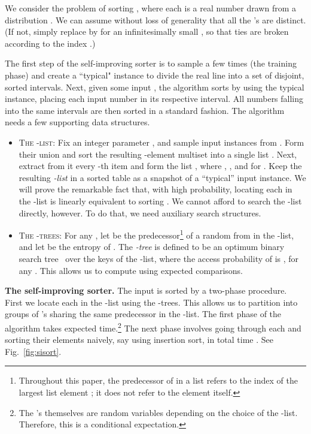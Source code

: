 \documentclass{siamltex}
\begin{document}
We consider the problem of sorting , where each  is
a real number drawn from a distribution . 
We can assume without loss of generality that all the 's
are distinct. (If not, simply replace  by  for 
an infinitesimally small , so that ties are broken according
to the index .)

The first step of the self-improving sorter is to sample  a few times
(the training phase) and create a ``typical" instance to divide the real line
into a set of disjoint, sorted intervals.  Next, given some input , the
algorithm sorts  by using the typical instance, placing each input number in
its respective interval. All numbers falling into the same intervals are then
sorted in a standard fashion. The algorithm needs a few supporting data
structures.


\begin{itemize}
\item
\textsc{The -list:}
Fix an integer parameter ,
and sample  input instances from . 
Form their union and sort the resulting -element multiset
into a single list .
Next, extract from it every -th item and form the list 
, where , ,
and  for .
Keep the resulting \emph{-list} in a sorted table as 
a snapshot of a ``typical'' input instance.
We will prove the remarkable fact that,
with high probability, locating each  in the -list
is linearly equivalent to sorting .
We cannot afford to search the -list
directly, however. To do that, we need auxiliary search structures.

\item
\textsc{The -trees:}
For any , let  
be the predecessor\footnote{Throughout this paper,
the predecessor of  in a list refers to the index of
the largest list element ; it does not
refer to the element itself.}
of a random  from  
in the -list, and let  be the entropy of 
.
The \emph{-tree} is defined to be an optimum binary search 
tree~\cite{Mehlhorn} over 
the keys of the -list, where the access probability of 
 is ,
for any .
This allows us to compute 
using  expected comparisons.

\end{itemize}

\textbf{The self-improving sorter.} The input  is sorted 
by a two-phase procedure.  First we locate each  in 
the -list using the -trees. This allows us to 
partition  into groups 
of 's sharing the same predecessor in the -list.
The first phase of the algorithm takes  
expected time.\footnote{The 's themselves are 
random variables depending on the choice of the -list. 
Therefore, this is a conditional expectation.}
The next phase involves going through each  and
sorting their elements naively, say using insertion sort, in
total time . See Fig.~\ref{fig:sisort}.
\medskip
\end{document}
